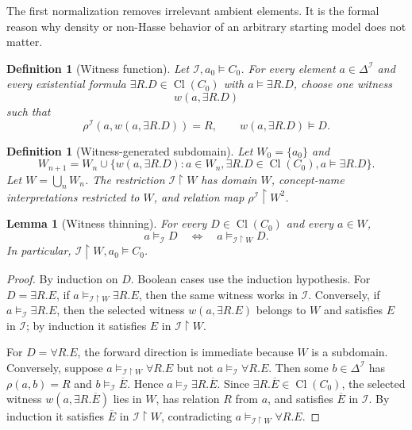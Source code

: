 \documentclass[11pt]{article}
\newtheorem{lemma}[theorem]{Lemma}
\newtheorem{definition}[theorem]{Definition}
\newcommand{\Cl}{\operatorname{Cl}}
\newcommand{\restrict}{\upharpoonright}
\begin{document}
The first normalization removes irrelevant ambient elements.  It is the formal reason why density or non-Hasse behavior of an arbitrary starting model does not matter.

\begin{definition}[Witness function]
Let $\mathcal I,a_0\models C_0$.  For every element $a\in\Delta^\mathcal I$ and every existential formula $\exists R.D\in\Cl(C_0)$ with $a\models\exists R.D$, choose one witness
\[
  w(a,\exists R.D)
\]
such that
\[
  \rho^\mathcal I(a,w(a,\exists R.D))=R,
  \qquad
  w(a,\exists R.D)\models D.
\]
\end{definition}

\begin{definition}[Witness-generated subdomain]
Let $W_0=\{a_0\}$ and
\[
  W_{n+1}=W_n\cup\{w(a,\exists R.D):a\in W_n,
  \exists R.D\in\Cl(C_0),
  a\models\exists R.D\}.
\]
Let $W=\bigcup_n W_n$.  The restriction $\mathcal I\restrict W$ has domain $W$, concept-name interpretations restricted to $W$, and relation map $\rho^\mathcal I\restrict W^2$.
\end{definition}

\begin{lemma}[Witness thinning]
For every $D\in\Cl(C_0)$ and every $a\in W$,
\[
  a\models_{\mathcal I}D
  \quad\Longleftrightarrow\quad
  a\models_{\mathcal I\restrict W}D.
\]
In particular, $\mathcal I\restrict W,a_0\models C_0$.
\end{lemma}

\begin{proof}
By induction on $D$.  Boolean cases use the induction hypothesis.  For $D=\exists R.E$, if $a\models_{\mathcal I\restrict W}\exists R.E$, then the same witness works in $\mathcal I$.  Conversely, if $a\models_{\mathcal I}\exists R.E$, then the selected witness $w(a,\exists R.E)$ belongs to $W$ and satisfies $E$ in $\mathcal I$; by induction it satisfies $E$ in $\mathcal I\restrict W$.

For $D=\forall R.E$, the forward direction is immediate because $W$ is a subdomain.  Conversely, suppose $a\models_{\mathcal I\restrict W}\forall R.E$ but not $a\models_{\mathcal I}\forall R.E$.  Then some $b\in\Delta^\mathcal I$ has $\rho(a,b)=R$ and $b\models_{\mathcal I}\overline E$.  Hence $a\models_{\mathcal I}\exists R.\overline E$.  Since $\exists R.\overline E\in\Cl(C_0)$, the selected witness $w(a,\exists R.\overline E)$ lies in $W$, has relation $R$ from $a$, and satisfies $\overline E$ in $\mathcal I$.  By induction it satisfies $\overline E$ in $\mathcal I\restrict W$, contradicting $a\models_{\mathcal I\restrict W}\forall R.E$.
\end{proof}
\end{document}
